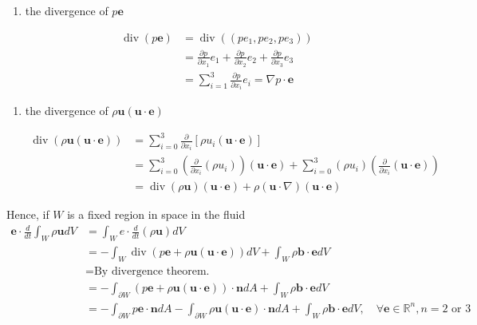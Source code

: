 \begin{enumerate}
	\item the divergence of $p\textbf{e}$

\begin{equation}
\begin{aligned}
\operatorname{div}(p \textbf{e})
&= \operatorname{div}\left((pe_1,pe_2,pe_3)\right)\\
&= \frac{\partial p}{\partial x_1} e_1 + \frac{\partial p}{\partial x_2} e_2 + \frac{\partial p}{\partial x_3} e_3\\
&= \sum_{i=1}^{3} \frac{\partial p}{\partial x_i} e_i = \nabla p \cdot \textbf{e}
\end{aligned}
\end{equation}

\end{enumerate}
\begin{enumerate}
	\item the divergence of $\rho \textbf{u}(\textbf{u}\cdot\textbf{e})$

\begin{equation}
\begin{aligned}
\operatorname{div}(\rho \textbf{u}(\textbf{u}\cdot \textbf{e}))
&= \sum_{i=0}^{3} \frac{\partial}{\partial x_i}\left[\rho u_i (\textbf{u}\cdot \textbf{e})\right]\\
&= \sum_{i=0}^{3}\left(\frac{\partial }{\partial x_i}(\rho u_i)\right)(\textbf{u}\cdot \textbf{e})
+  \sum_{i=0}^{3}(\rho u_i)\left(\frac{\partial }{\partial x_i} (\textbf{u}\cdot \textbf{e})\right)\\
&= \operatorname{div}(\rho \textbf{u})(\textbf{u}\cdot \textbf{e})
+ \rho (\textbf{u}\cdot \nabla) (\textbf{u}\cdot \textbf{e})
\end{aligned}
\end{equation}

\end{enumerate}
Hence, if $W$ is a fixed region in space in the fluid 
\begin{equation}
\begin{aligned}
\textbf{e}\cdot \frac{d}{dt} \int_{W} \rho \textbf{u} dV
&= \int _{W} e \cdot \frac{d}{dt}(\rho \textbf{u}) dV \\
&= -\int_{W} \operatorname{div}(p\textbf{e} + \rho \textbf{u}(\textbf{u}\cdot \textbf{e})) dV
+ \int_{W} \rho \textbf{b}\cdot \textbf{e} dV\\
&= \text{By divergence theorem.}\\
&= -\int_{\partial W} (p\textbf{e} + \rho \textbf{u} (\textbf{u}\cdot \textbf{e})) \cdot \textbf{n}dA
+ \int_{W} \rho \textbf{b}\cdot \textbf{e} dV\\
&= -\int_{\partial W} p\textbf{e} \cdot \textbf{n}dA
-\int_{\partial W}\rho \textbf{u} (\textbf{u}\cdot \textbf{e})\cdot \textbf{n}dA
+ \int_{W} \rho \textbf{b}\cdot \textbf{e} dV,\quad \forall \textbf{e}\in \mathbb{R}^{n},n=2\text{ or }3
\end{aligned}
\end{equation}
